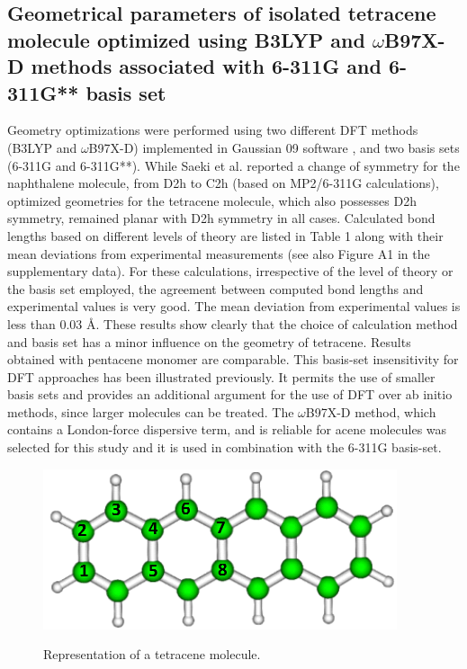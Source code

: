\singlespacing
\subsection{Geometrical parameters of isolated tetracene molecule optimized using B3LYP and $\omega$B97X-D methods associated with 6-311G and 6-311G** basis set}


Geometry optimizations were performed using two different DFT methods (B3LYP and $\omega$B97X-D) implemented in Gaussian 09 software \cite{frisch2009gaussian}, and two basis sets (6-311G and 6-311G**). While Saeki et al. \cite{saeki2006theoretical}  reported a change of symmetry for the naphthalene molecule, from D2h to C2h (based on MP2/6-311G calculations), optimized geometries for the tetracene molecule, which also possesses D2h symmetry, remained planar with D2h symmetry in all cases. Calculated bond lengths based on different levels of theory are listed in Table 1 along with their mean deviations from experimental measurements (see also Figure A1 in the supplementary data). For these calculations, irrespective of the level of theory or the basis set employed, the agreement between computed bond lengths and experimental values is very good. The mean deviation from experimental values is less than 0.03 Å. These results show clearly that the choice of calculation method and basis set has a minor influence on the geometry of tetracene. Results obtained with pentacene monomer are comparable. This basis-set insensitivity for DFT approaches has been illustrated previously\cite{bauschlicher1995sensitivity}. It permits the use of smaller basis sets and provides an additional argument for the use of DFT over ab initio methods, since larger molecules can be treated. The $\omega$B97X-D method, which contains a London-force dispersive term, and is reliable for acene molecules was selected for this study and it is used in combination with the 6-311G basis-set.

\begin{figure}[H]
	\centering
	\includegraphics[scale=0.6]{image/tetracene-molecule}\label{tetracene-molecule}
	\caption{Representation of a tetracene molecule.}
\end{figure}

